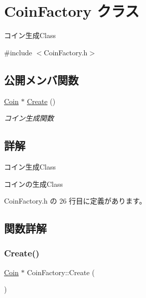 \hypertarget{class_coin_factory}{}\section{Coin\+Factory クラス}
\label{class_coin_factory}


コイン生成\+Class  




{\ttfamily \#include $<$Coin\+Factory.\+h$>$}

\subsection*{公開メンバ関数}
\begin{DoxyCompactItemize}
\item 
\mbox{\hyperlink{class_coin}{Coin}} $\ast$ \mbox{\hyperlink{class_coin_factory_ac65c17037097630fa8e022aa7216aba8}{Create}} ()
\begin{DoxyCompactList}\small\item\em コイン生成関数 \end{DoxyCompactList}\end{DoxyCompactItemize}


\subsection{詳解}
コイン生成\+Class 

コインの生成\+Class 

 Coin\+Factory.\+h の 26 行目に定義があります。



\subsection{関数詳解}
\mbox{\label{class_coin_factory_ac65c17037097630fa8e022aa7216aba8}} 
\subsubsection{\texorpdfstring{Create()}{Create()}}
{\footnotesize\ttfamily \mbox{\hyperlink{class_coin}{Coin}} $\ast$ Coin\+Factory\+::\+Create (\begin{DoxyParamCaption}{ }\end{DoxyParamCaption})}



